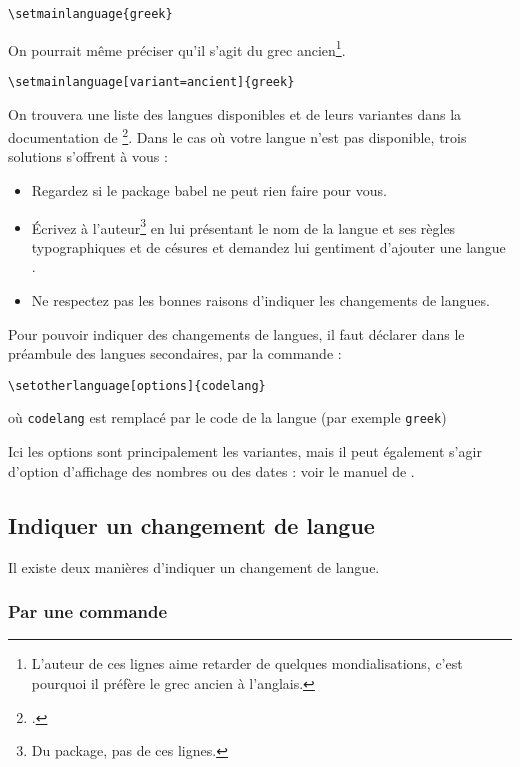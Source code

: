 \begin{verbatim}
\setmainlanguage{greek}
\end{verbatim}

On pourrait même préciser qu'il s'agit du grec ancien\footnote{L'auteur de ces lignes aime retarder de quelques mondialisations, c'est pourquoi il préfère le grec ancien à l'anglais.}.

\begin{verbatim}
\setmainlanguage[variant=ancient]{greek}
\end{verbatim}


On trouvera une liste des langues disponibles et de leurs variantes dans la documentation de \footcite{polyglossia}. Dans le cas où votre langue n'est pas disponible, trois solutions s'offrent à vous :
\begin{itemize}
\item Regardez si le package babel ne peut rien faire pour vous. 
\item Écrivez à l'auteur\footnote{Du package, pas de ces lignes.} en lui présentant le nom de la langue et ses règles typographiques et de césures et demandez lui gentiment d'ajouter une langue .
\item Ne respectez pas les bonnes raisons d'indiquer les changements de langues.
\end{itemize}

Pour pouvoir indiquer des changements de langues, il faut déclarer dans le préambule des langues secondaires, par la commande :

\begin{verbatim}
\setotherlanguage[options]{codelang}
\end{verbatim}

où \verb|codelang| est remplacé par le code de la langue (par exemple \verb|greek|)

Ici les options sont principalement les variantes, mais il peut également s'agir d'option d'affichage des nombres ou des dates : voir le manuel de .

\subsection{Indiquer un changement de langue}

Il existe deux manières d'indiquer un changement de langue.

\subsubsection{Par une commande}

